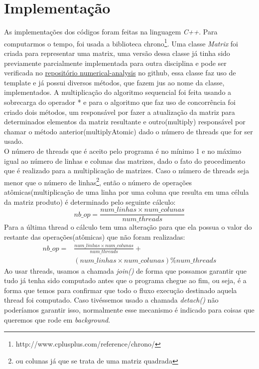 
\section{Implementação}
As implementações dos códigos foram feitas na linguagem \textit{C++}.
Para computarmos o tempo, foi usada a biblioteca chrono\footnote{http://www.cplusplus.com/reference/chrono/}. Uma classe \textit{Matrix} foi criada para representar uma matrix, uma versão dessa classe já tinha sido previamente parcialmente implementada para outra disciplina e pode ser verificada no \href{https://github.com/raquel-oliveira/numerical-analysis}{repositório numerical-analysis} no github, essa classe faz uso de template e já possui diversos métodos, que fazem jus ao nome da classe, implementados. A multiplicação do algoritmo sequencial foi feita usando a sobrecarga do operador * e para o algoritmo que faz uso de concorrência foi criado dois métodos, um responsável por fazer a atualização da matriz para determinados elementos da matriz resultante e outro(multiply) responsável por chamar o método anterior(multiplyAtomic) dado o número de threads que for ser usado.\\
O número de threads que é aceito pelo programa é no mínimo 1 e no máximo igual ao número de linhas e colunas das matrizes, dado o fato do procedimento que é realizado para a multiplicação de matrizes. Caso o número de threads seja menor que o número de linhas\footnote{ou colunas já que se trata de uma matriz quadrada}, então o número de operações atômicas(multiplicação de uma linha por uma coluna que resulta em uma célula da matriz produto) é determinado pelo seguinte cálculo:
\begin{equation*}
	nb\_op = \frac{num\_linhas \times num\_colunas}{num\_threads}
\end{equation*}
Para a última thread o cálculo tem uma alteração para que ela possua o valor do restante das operações(atômicas) que não foram realizadas:
\begin{align*}
	nb\_op = &\frac{num\_linhas \times num\_colunas}{num\_threads} +\\ &(num\_linhas \times num\_colunas)\% num\_threads
\end{align*}
Ao usar threads, usamos a chamada \textit{join()} de forma que possamos garantir que tudo já tenha sido computado antes que o programa chegue ao fim, ou seja, é a forma que temos para confirmar que todo o fluxo execução destinado aquela thread foi computado. Caso tivéssemos usado a chamada \textit{detach()} não poderíamos garantir isso, normalmente esse mecanismo é indicado para coisas que queremos que rode em \textit{background}.
\vfill
